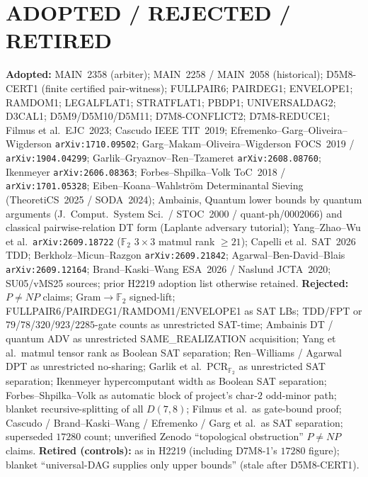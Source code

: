\documentclass[11pt]{article}
\begin{document}
\section*{ADOPTED / REJECTED / RETIRED}
\textbf{Adopted:} MAIN~2358 (arbiter); MAIN~2258 / MAIN~2058 (historical);
D5M8-CERT1 (finite certified pair-witness); FULLPAIR6; PAIRDEG1; ENVELOPE1;
RAMDOM1; LEGALFLAT1; STRATFLAT1; PBDP1; UNIVERSALDAG2; D3CAL1;
D5M9/D5M10/D5M11; D7M8-CONFLICT2; D7M8-REDUCE1; Filmus et al.\ EJC~2023;
Cascudo IEEE TIT~2019; Efremenko--Garg--Oliveira--Wigderson
\texttt{arXiv:1710.09502}; Garg--Makam--Oliveira--Wigderson FOCS~2019 /
\texttt{arXiv:1904.04299}; Garlik--Gryaznov--Ren--Tzameret
\texttt{arXiv:2608.08760}; Ikenmeyer \texttt{arXiv:2606.08363};
Forbes--Shpilka--Volk ToC~2018 / \texttt{arXiv:1701.05328};
Eiben--Koana--Wahlstr\"om Determinantal Sieving (TheoretiCS~2025 / SODA~2024);
Ambainis, Quantum lower bounds by quantum arguments (J.\ Comput.\ System Sci.\ /
STOC~2000 / quant-ph/0002066) and classical pairwise-relation DT form
(Laplante adversary tutorial); Yang--Zhao--Wu et al.\
\texttt{arXiv:2609.18722} ($\mathbb F_2$ $3\times 3$ matmul rank $\ge 21$);
Capelli et al.\ SAT~2026 TDD; Berkholz--Micun--Razgon \texttt{arXiv:2609.21842};
Agarwal--Ben-David--Blais \texttt{arXiv:2609.12164}; Brand--Kaski--Wang ESA~2026 /
Naslund JCTA~2020; SU05/vMS25 sources; prior H2219 adoption list otherwise
retained.
\textbf{Rejected:} $P\neq NP$ claims; Gram$\to\mathbb F_2$ signed-lift;
FULLPAIR6/PAIRDEG1/RAMDOM1/ENVELOPE1 as SAT LBs; TDD/FPT or
$79$/$78$/$320$/$923$/$2285$-gate counts as unrestricted SAT-time;
Ambainis DT / quantum ADV as unrestricted SAME\_REALIZATION acquisition;
Yang et al.\ matmul tensor rank as Boolean SAT separation; Ren--Williams /
Agarwal DPT as unrestricted no-sharing; Garlik et al.\ PCR$_{\mathbb F_2}$ as
unrestricted SAT separation; Ikenmeyer hypercomputant width as Boolean SAT
separation; Forbes--Shpilka--Volk as automatic block of project's char-$2$
odd-minor path; blanket recursive-splitting of all $D(7,8)$; Filmus et al.\ as
gate-bound proof; Cascudo / Brand--Kaski--Wang / Efremenko / Garg et al.\ as
SAT separation; superseded $17280$ count; unverified Zenodo ``topological
obstruction'' $P\neq NP$ claims.
\textbf{Retired (controls):} as in H2219 (including D7M8-1's $17280$ figure);
blanket ``universal-DAG supplies only upper bounds'' (stale after D5M8-CERT1).
\end{document}
